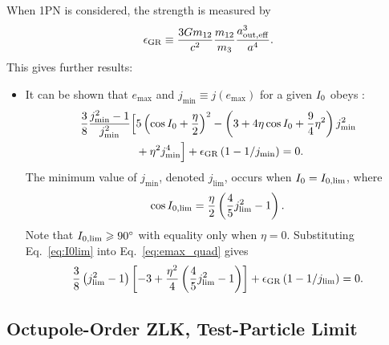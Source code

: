 \documentclass[
        fleqn,
        usenatbib,
    ]{mnras}
\newcommand*{\p}[1]{\left(#1\right)}
\newcommand*{\s}[1]{\left[#1\right]}
\begin{document}
When 1PN is considered, the strength is measured by
\begin{equation}
    \epsilon_{\rm GR} \equiv \frac{3Gm_{12}}{c^2}
        \frac{m_{12}}{m_3}\frac{a_{\rm out, eff}^3}{a^4}.
\end{equation}
This gives further results:
\begin{itemize}
    \item It can be shown that $e_{\max}$ and $j_{\min} \equiv j(e_{\max})$ for
        a given $I_{\rm 0}$ obeys \citep{LML15, anderson2016formation}:
        \begin{align}
            \frac{3}{8}\frac{j_{\min}^2 - 1}{j_{\min}^2}\Big[&
                5\p{\cos I_0 + \frac{\eta}{2}}^2
                - \p{3 + 4\eta \cos I_0 + \frac{9}{4}\eta^2}j_{\min}^2
                    \nonumber\\
                &+ \eta^2 j_{\min}^4
            \Big] + \epsilon_{\rm GR}\p{1 - 1 / j_{\min}} = 0.\label{eq:emax_quad}
        \end{align}
        The minimum value of $j_{\min}$, denoted $j_{\lim}$, occurs when $I_0
        = I_{\rm 0, \lim}$, where
        \begin{equation}
            \cos I_{\rm 0, \lim} = \frac{\eta}{2}\p{\frac{4}{5}j_{\lim}^2 -
                1}.\label{eq:I0lim}
        \end{equation}
        Note that $I_{\rm 0, \lim} \geq 90^\circ$ with equality only when $\eta
        = 0$. Substituting Eq.~\eqref{eq:I0lim} into Eq.~\eqref{eq:emax_quad}
        gives
        \begin{equation}
            \frac{3}{8}\p{j_{\lim}^2 - 1}\s{-3 + \frac{\eta^2}{4}
                \p{\frac{4}{5}j_{\lim}^2 - 1}}
                + \epsilon_{\rm GR}\p{1 - 1 / j_{\lim}} = 0.
                \label{eq:def_elim}
        \end{equation}
\end{itemize}

\subsection{Octupole-Order ZLK, Test-Particle Limit}
\end{document}
